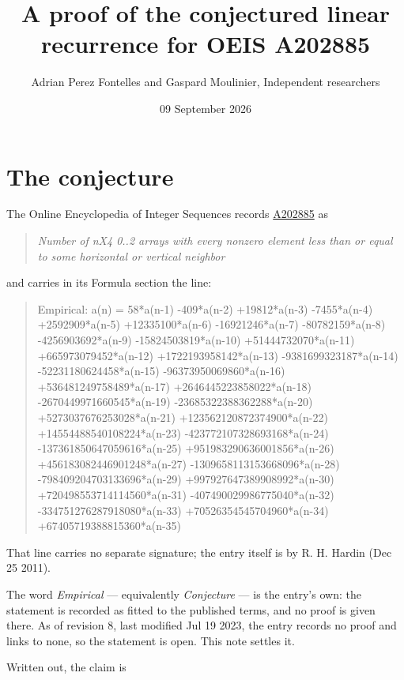 \documentclass[11pt]{article}
\title{A proof of the conjectured linear recurrence for OEIS A202885}
\author{Adrian Perez Fontelles and Gaspard Moulinier, Independent researchers}
\date{09 September 2026}
\theoremstyle{definition}
\begin{document}
\maketitle
\section{The conjecture}

The Online Encyclopedia of Integer Sequences records \href{https://oeis.org/A202885}{A202885} as

\begin{quote}\itshape Number of nX4 0..2 arrays with every nonzero element less than or equal to some horizontal or vertical neighbor\end{quote}

and carries in its Formula section the line:

\begin{quote}\ttfamily Empirical: a(n) = 58*a(n-1) -409*a(n-2) +19812*a(n-3) -7455*a(n-4) +2592909*a(n-5) +12335100*a(n-6) -16921246*a(n-7) -80782159*a(n-8) -4256903692*a(n-9) -15824503819*a(n-10) +51444732070*a(n-11) +665973079452*a(n-12) +1722193958142*a(n-13) -9381699323187*a(n-14) -52231180624458*a(n-15) -96373950069860*a(n-16) +536481249758489*a(n-17) +2646445223858022*a(n-18) -2670449971660545*a(n-19) -23685322388362288*a(n-20) +5273037676253028*a(n-21) +123562120872374900*a(n-22) +14554488540108224*a(n-23) -423772107328693168*a(n-24) -137361850647059616*a(n-25) +951983290636001856*a(n-26) +456183082446901248*a(n-27) -1309658113153668096*a(n-28) -798409204703133696*a(n-29) +997927647389908992*a(n-30) +720498553714114560*a(n-31) -407490029986775040*a(n-32) -334751276287918080*a(n-33) +70526354545704960*a(n-34) +67405719388815360*a(n-35)\end{quote}

That line carries no separate signature; the entry itself is by R. H. Hardin (Dec 25 2011).

The word {\itshape Empirical} --- equivalently {\itshape Conjecture} --- is the entry's own: the statement is recorded as fitted to the published terms, and no proof is given there. As of revision 8, last modified Jul 19 2023, the entry records no proof and links to none, so the statement is open. This note settles it.

Written out, the claim is
\end{document}
